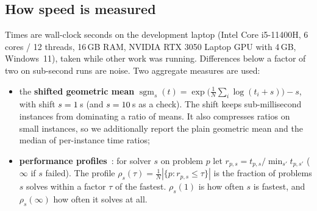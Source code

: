 \subsection{How speed is measured}
Times are wall-clock seconds on the development laptop (Intel Core i5-11400H, 6 cores / 12 threads,
16\,GB RAM, NVIDIA RTX 3050 Laptop GPU with 4\,GB, Windows~11), taken while other work was running.
Differences below a factor of two on sub-second runs are noise. Two aggregate measures are used:
\begin{itemize}
  \item the \textbf{shifted geometric mean} $\operatorname{sgm}_s(t)=\exp\bigl(\frac1N\sum_i\log(t_i+s)\bigr)-s$,
        with shift $s=1$\,s (and $s=10$\,s as a check). The shift keeps sub-millisecond
        instances from dominating a ratio of means. It also compresses ratios on small instances,
        so we additionally report the plain geometric mean and the median of per-instance time ratios;
  \item \textbf{performance profiles}~\cite{dolan2002}: for solver $s$ on problem $p$ let
        $r_{p,s}=t_{p,s}/\min_{s'}t_{p,s'}$ ($\infty$ if $s$ failed). The profile
        $\rho_s(\tau)=\frac1N|\{p: r_{p,s}\le\tau\}|$ is the fraction of problems $s$ solves within a
        factor $\tau$ of the fastest. $\rho_s(1)$ is how often $s$ is fastest, and $\rho_s(\infty)$ how
        often it solves at all.
\end{itemize}
